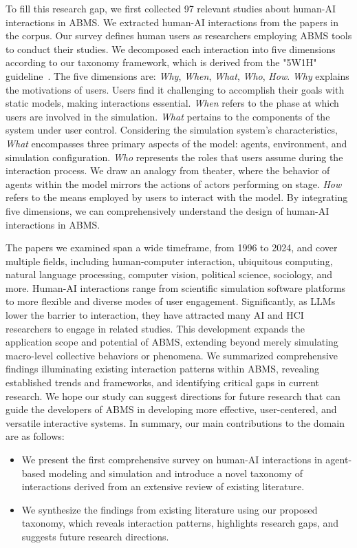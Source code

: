 To fill this research gap, we first collected 97 relevant studies about human-AI interactions in ABMS.
We extracted human-AI interactions from the papers in the corpus.
Our survey defines human users as researchers employing ABMS tools to conduct their studies.
We decomposed each interaction into five dimensions according to our taxonomy framework, which is derived from the "5W1H" guideline~\cite{ram_5ws_2018}.
The five dimensions are: \textit{Why}, \textit{When}, \textit{What}, \textit{Who}, \textit{How}.%
\textit{Why} explains the motivations of users.
Users find it challenging to accomplish their goals with static models, making interactions essential.
\textit{When} refers to the phase at which users are involved in the simulation.
\textit{What} pertains to the components of the system under user control. Considering the simulation system's characteristics, \textit{What} encompasses three primary aspects of the model: agents, environment, and simulation configuration.
\textit{Who} represents the roles that users assume during the interaction process.
We draw an analogy from theater, where the behavior of agents within the model mirrors the actions of actors performing on stage.
\textit{How} refers to the means employed by users to interact with the model.%
By integrating five dimensions, we can comprehensively understand the design of human-AI interactions in ABMS.

The papers we examined span a wide timeframe, from 1996 to 2024, and cover multiple fields, including human-computer interaction, ubiquitous computing, natural language processing, computer vision, political science, sociology, and more.
Human-AI interactions range from scientific simulation software platforms to more flexible and diverse modes of user engagement.
Significantly, as LLMs lower the barrier to interaction, they have attracted many AI and HCI researchers to engage in related studies. 
This development expands the application scope and potential of ABMS, extending beyond merely simulating macro-level collective behaviors or phenomena.
We summarized comprehensive findings illuminating existing interaction patterns within ABMS, revealing established trends and frameworks, and identifying critical gaps in current research.
We hope our study can suggest directions for future research that can guide the developers of ABMS in developing more effective, user-centered, and versatile interactive systems.
In summary, our main contributions to the domain are as follows:
\begin{itemize}
\item We present the first comprehensive survey on human-AI interactions in agent-based modeling and simulation and introduce a novel taxonomy of interactions derived from an extensive review of existing literature.
\item We synthesize the findings from existing literature using our proposed taxonomy, which reveals interaction patterns, highlights research gaps, and suggests future research directions.
\end{itemize}